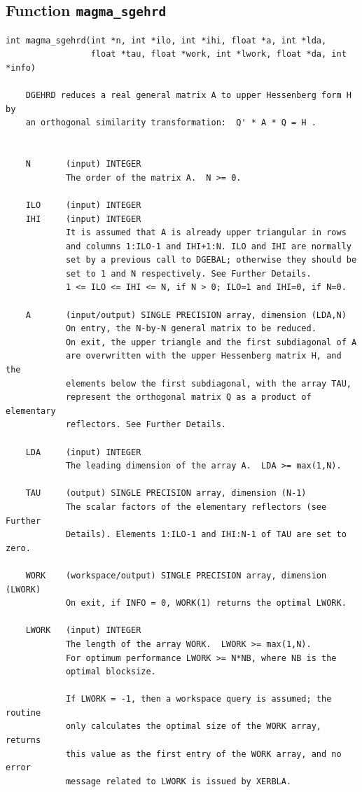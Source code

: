 \documentclass[10pt]{book}
\begin{document}
\subsection{Function {\tt {\bf magma\_sgehrd}}}
\begin{verbatim}
int magma_sgehrd(int *n, int *ilo, int *ihi, float *a, int *lda,
                 float *tau, float *work, int *lwork, float *da, int *info)

    DGEHRD reduces a real general matrix A to upper Hessenberg form H by
    an orthogonal similarity transformation:  Q' * A * Q = H .


    N       (input) INTEGER
            The order of the matrix A.  N >= 0.

    ILO     (input) INTEGER
    IHI     (input) INTEGER
            It is assumed that A is already upper triangular in rows
            and columns 1:ILO-1 and IHI+1:N. ILO and IHI are normally
            set by a previous call to DGEBAL; otherwise they should be
            set to 1 and N respectively. See Further Details.
            1 <= ILO <= IHI <= N, if N > 0; ILO=1 and IHI=0, if N=0.

    A       (input/output) SINGLE PRECISION array, dimension (LDA,N)
            On entry, the N-by-N general matrix to be reduced.
            On exit, the upper triangle and the first subdiagonal of A
            are overwritten with the upper Hessenberg matrix H, and the
            elements below the first subdiagonal, with the array TAU,
            represent the orthogonal matrix Q as a product of elementary
            reflectors. See Further Details.

    LDA     (input) INTEGER
            The leading dimension of the array A.  LDA >= max(1,N).

    TAU     (output) SINGLE PRECISION array, dimension (N-1)
            The scalar factors of the elementary reflectors (see Further
            Details). Elements 1:ILO-1 and IHI:N-1 of TAU are set to zero.

    WORK    (workspace/output) SINGLE PRECISION array, dimension (LWORK)
            On exit, if INFO = 0, WORK(1) returns the optimal LWORK.

    LWORK   (input) INTEGER
            The length of the array WORK.  LWORK >= max(1,N).
            For optimum performance LWORK >= N*NB, where NB is the
            optimal blocksize.

            If LWORK = -1, then a workspace query is assumed; the routine
            only calculates the optimal size of the WORK array, returns
            this value as the first entry of the WORK array, and no error
            message related to LWORK is issued by XERBLA.


\end{verbatim}
\end{document}
